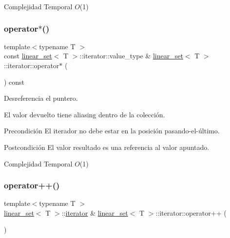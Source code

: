 \begin{DoxyDescription}
\item[Complejidad Temporal]$O$(1)
\end{DoxyDescription}\mbox{\label{classlinear__set_1_1iterator_a864abc467f3d3e26210c26f60eff7630}} 
\subsubsection{\texorpdfstring{operator$\ast$()}{operator*()}}
{\footnotesize\ttfamily template$<$typename T $>$ \\
const \mbox{\hyperlink{classlinear__set}{linear\+\_\+set}}$<$ T $>$\+::iterator\+::value\+\_\+type \& \mbox{\hyperlink{classlinear__set}{linear\+\_\+set}}$<$ T $>$\+::iterator\+::operator$\ast$ (\begin{DoxyParamCaption}{ }\end{DoxyParamCaption}) const}



Desreferencia el puntero. 

El valor devuelto tiene aliasing dentro de la colección.

\begin{DoxyPrecond}{Precondición}
El iterador no debe estar en la posición pasando-\/el-\/último. 
\end{DoxyPrecond}
\begin{DoxyPostcond}{Postcondición}
El valor resultado es una referencia al valor apuntado.
\end{DoxyPostcond}

\begin{DoxyDescription}
\item[Complejidad Temporal]$O$(1)
\end{DoxyDescription}\mbox{\label{classlinear__set_1_1iterator_a5520c75db974b7f2f61d677bc5ae4d0d}} 
\subsubsection{\texorpdfstring{operator++()}{operator++()}}
{\footnotesize\ttfamily template$<$typename T $>$ \\
\mbox{\hyperlink{classlinear__set}{linear\+\_\+set}}$<$ T $>$\+::\mbox{\hyperlink{classlinear__set_1_1iterator}{iterator}} \& \mbox{\hyperlink{classlinear__set}{linear\+\_\+set}}$<$ T $>$\+::iterator\+::operator++ (\begin{DoxyParamCaption}{ }\end{DoxyParamCaption})}



